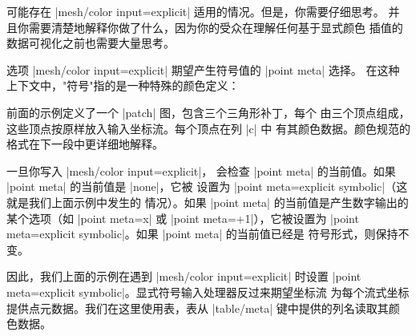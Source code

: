 {{可能存在 |mesh/color input=explicit| 适用的情况。但是，你需要仔细思考。
并且你需要清楚地解释你做了什么，因为你的受众在理解任何基于显式颜色
插值的数据可视化之前也需要大量思考。

选项 |mesh/color input=explicit| 期望产生符号值的 |point meta| 选择。
在这种上下文中，"符号"指的是一种特殊的颜色定义：
%
\begin{codeexample}[]
\end{codeexample}
%
\noindent 前面的示例定义了一个 |patch| 图，包含三个三角形补丁，每个
由三个顶点组成，这些顶点按原样放入输入坐标流。每个顶点在列 |c| 中
有其颜色数据。颜色规范的格式在下一段中更详细地解释。

一旦你写入 |mesh/color input=explicit|，\PGFPlots{} 会检查
|point meta| 的当前值。如果 |point meta| 的当前值是 |none|，它被
设置为 |point meta=explicit symbolic|（这就是我们上面示例中发生的
情况）。如果 |point meta| 的当前值是产生数字输出的某个选项（如
|point meta=x| 或 |point meta=+1|），它被设置为
|point meta=explicit symbolic|。如果 |point meta| 的当前值已经是
符号形式，则保持不变。

因此，我们上面的示例在遇到 |mesh/color input=explicit| 时设置
|point meta=explicit symbolic|。显式符号输入处理器反过来期望坐标流
为每个流式坐标提供点元数据。我们在这里使用表，表从 |table/meta|
键中提供的列名读取其颜色数据。

}}
